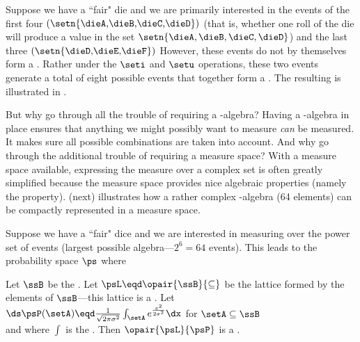 \begin{example}
\label{ex:die_first4}
Suppose we have a ``fair" die and we are primarily interested in the
events of the first four
$\left(\setn{\text{\dieA,\dieB,\dieC,\dieD}}\right)$
(that is, whether one roll of the die will produce
a value in the set $\setn{\dieA,\dieB,\dieC,\dieD}$)
and the last three
$\left(\setn{\text{\dieD,\dieE,\dieF}}\right)$
However, these events do not by themselves form a .
Rather under the $\seti$ and $\setu$ operations, these two events generate
a total of eight possible events that together form a .
The resulting  is illustrated in .
\end{example}

But why go through all the trouble of requiring a \txsigma-algebra?
Having a \txsigma-algebra in place ensures that anything we might possibly 
want to measure {\em can} be measured.
It makes sure all possible combinations are taken into account.
And why go through the additional trouble of requiring a measure space?
With a measure space available, expressing the measure over a complex
set is often greatly simplified because the measure space provides nice 
algebraic properties (namely the  property).
 (next) illustrates how a rather complex
\txsigma-algebra (64 elements) can be compactly represented in a measure space.
\begin{example}
\label{ex:prob_123456}
Suppose we have a ``fair" dice and we are interested in measuring over the
power set of events (largest possible algebra---$2^6=64$ events).
This leads to the probability space $\ps$ where
\end{example}

\begin{example}
Let $\ssB$ be the .
Let $\psL\eqd\opair{\ssB}{\subseteq}$ be the lattice formed by the elements of $\ssB$---this
lattice is a .
Let 
\\\indentx$\ds\psP(\setA)\eqd\frac{1}{\sqrt{2\pi\sigma^2}}\int_\setA e^{\frac{x^2}{2\sigma^2}}\dx$ for $\setA\subseteq\ssB$\\
and where $\int$ is the  .
Then $\opair{\psL}{\psP}$ is a . 
\end{example}

